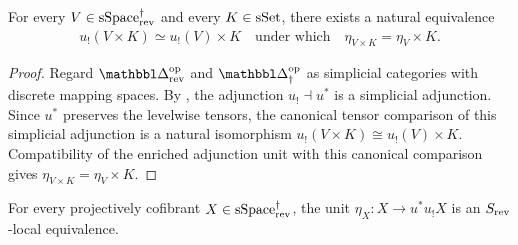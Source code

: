 \documentclass[a4paper,dvipdfmx,11pt]{amsart}
\begin{document}
\begin{lemma}\label{h1.lem.tensor}
  For every $V\in\mathrm{sSpace}^{\dag}_{\mathrm{rev}}$ and every $K\in\mathrm{sSet}$, there exists a natural equivalence 
  \begin{align}
    u_{!}(V\times K)\simeq u_{!}(V)\times K
    \quad \text{under which} \quad 
    \eta_{V\times K}=\eta_V\times K.
  \end{align}
\end{lemma}

\begin{proof}
  Regard $\prism_{\rev}^{\myop}$ and $\prism_{\dag}^{\myop}$ as simplicial categories with discrete mapping spaces.
  By \cite[Proposition~A.3.3.7]{HTT}, the adjunction $u_{!}\dashv u^{*}$ is a simplicial adjunction.
  Since $u^{*}$ preserves the levelwise tensors, the canonical tensor comparison of this simplicial adjunction is a natural isomorphism $ u_{!}(V\times K)\cong u_{!}(V)\times K$.
  Compatibility of the enriched adjunction unit with this canonical comparison gives $\eta_{V\times K}=\eta_V\times K$.
\end{proof}

\begin{proposition}\label{h1.lem.unit-cofibrant}
  For every projectively cofibrant $X\in\mathrm{sSpace}^{\dag}_{\mathrm{rev}}$, the unit $\eta_X:X\to u^{*}u_{!}X$ is an $S_{\mathrm{rev}}$-local equivalence.
\end{proposition}
\end{document}

